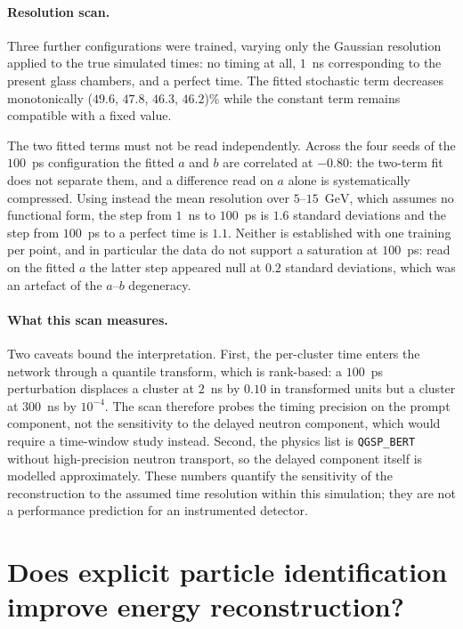 \documentclass[11pt,a4paper]{article}
\newcommand{\GeV}{\ensuremath{\mathrm{GeV}}}
\begin{document}
\paragraph{Resolution scan.} Three further configurations were trained, varying only
the Gaussian resolution applied to the true simulated times: no timing at all,
$1$~ns corresponding to the present glass chambers, and a perfect time. The fitted
stochastic term decreases monotonically ($49.6$, $47.8$, $46.3$, $46.2$)\% while the
constant term remains compatible with a fixed value.

The two fitted terms must not be read independently. Across the four seeds of the
$100$~ps configuration the fitted $a$ and $b$ are correlated at $-0.80$: the two-term
fit does not separate them, and a difference read on $a$ alone is systematically
compressed. Using instead the mean resolution over $5$--$15$~\GeV{}, which assumes no
functional form, the step from $1$~ns to $100$~ps is $1.6$ standard deviations and the
step from $100$~ps to a perfect time is $1.1$. Neither is established with one
training per point, and in particular the data do not support a saturation at
$100$~ps: read on the fitted $a$ the latter step appeared null at $0.2$ standard
deviations, which was an artefact of the $a$--$b$ degeneracy.

\paragraph{What this scan measures.} Two caveats bound the interpretation. First, the
per-cluster time enters the network through a quantile transform, which is rank-based:
a $100$~ps perturbation displaces a cluster at $2$~ns by $0.10$ in transformed units
but a cluster at $300$~ns by $10^{-4}$. The scan therefore probes the timing precision
on the prompt component, not the sensitivity to the delayed neutron component, which
would require a time-window study instead. Second, the physics list is
\texttt{QGSP\_BERT} without high-precision neutron transport, so the delayed component
itself is modelled approximately. These numbers quantify the sensitivity of the
reconstruction to the assumed time resolution within this simulation; they are not a
performance prediction for an instrumented detector.

\section{Does explicit particle identification improve energy reconstruction?}
\label{sec:coupling}
\end{document}
